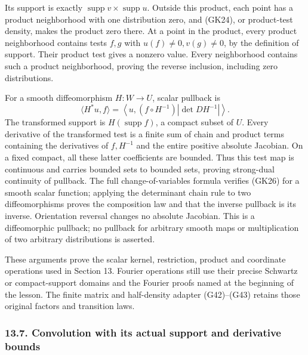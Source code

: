\documentclass[
  11pt,
]{article}
\begin{document}
Its support is exactly
\(\operatorname{supp}v\times\operatorname{supp}u\). Outside this
product, each point has a product neighborhood with one distribution
zero, and (GK24), or product-test density, makes the product zero there.
At a point in the product, every product neighborhood contains tests
\(f,g\) with \(u(f)\ne0,v(g)\ne0\), by the definition of support. Their
product test gives a nonzero value. Every neighborhood contains such a
product neighborhood, proving the reverse inclusion, including zero
distributions.

For a smooth diffeomorphism \(H:W\to U\), scalar pullback is \[
 \langle H^*u,f\rangle
  =\left\langle u,(f\circ H^{-1})|\det DH^{-1}|\right\rangle .
 \tag{GK26}
\] The transformed support is \(H(\operatorname{supp}f)\), a compact
subset of \(U\). Every derivative of the transformed test is a finite
sum of chain and product terms containing the derivatives of
\(f,H^{-1}\) and the entire positive absolute Jacobian. On a fixed
compact, all these latter coefficients are bounded. Thus this test map
is continuous and carries bounded sets to bounded sets, proving
strong-dual continuity of pullback. The full change-of-variables formula
verifies (GK26) for a smooth scalar function; applying the determinant
chain rule to two diffeomorphisms proves the composition law and that
the inverse pullback is its inverse. Orientation reversal changes no
absolute Jacobian. This is a diffeomorphic pullback; no pullback for
arbitrary smooth maps or multiplication of two arbitrary distributions
is asserted.

These arguments prove the scalar kernel, restriction, product and
coordinate operations used in Section 13. Fourier operations still use
their precise Schwartz or compact-support domains and the Fourier proofs
named at the beginning of the lesson. The finite matrix and half-density
adapter (G42)--(G43) retains those original factors and transition laws.

\subsubsection{13.7. Convolution with its actual support and derivative
bounds}\label{convolution-with-its-actual-support-and-derivative-bounds}
\end{document}
